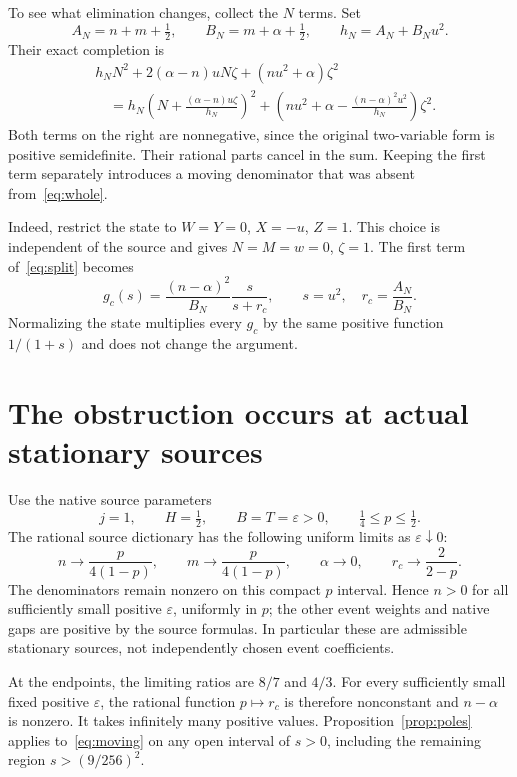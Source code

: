\documentclass[11pt]{article}
\begin{document}
To see what elimination changes, collect the $N$ terms. Set
\[
 A_N=n+m+\tfrac12,\qquad B_N=m+\alpha+\tfrac12,
 \qquad h_N=A_N+B_Nu^2.
\]
Their exact completion is
\begin{align}
 &h_NN^2+2(\alpha-n)uN\zeta+(nu^2+\alpha)\zeta^2 \nonumber\\
 &\quad=h_N\left(N+\frac{(\alpha-n)u\zeta}{h_N}\right)^2
 +\left(nu^2+\alpha-
       \frac{(n-\alpha)^2u^2}{h_N}\right)\zeta^2.       \label{eq:split}
\end{align}
Both terms on the right are nonnegative, since the original
two-variable form is positive semidefinite. Their rational parts cancel
in the sum. Keeping the first term separately introduces a moving
denominator that was absent from~\eqref{eq:whole}.

Indeed, restrict the state to $W=Y=0$, $X=-u$, $Z=1$. This choice is
independent of the source and gives $N=M=w=0$, $\zeta=1$. The first
term of~\eqref{eq:split} becomes
\begin{equation}
 g_c(s)=\frac{(n-\alpha)^2}{B_N}\frac{s}{s+r_c},
 \qquad s=u^2,\quad r_c=\frac{A_N}{B_N}.             \label{eq:moving}
\end{equation}
Normalizing the state multiplies every $g_c$ by the same positive
function $1/(1+s)$ and does not change the argument.

\section{The obstruction occurs at actual stationary sources}

Use the native source parameters
\begin{equation}
 j=1,\qquad H=\tfrac12,\qquad B=T=\varepsilon>0,
 \qquad \tfrac14\leq p\leq\tfrac12 .              \label{eq:path}
\end{equation}
The rational source dictionary has the following uniform limits as
$\varepsilon\downarrow0$:
\[
 n\longrightarrow\frac{p}{4(1-p)},\qquad
 m\longrightarrow\frac{p}{4(1-p)},\qquad
 \alpha\longrightarrow0,
 \qquad r_c\longrightarrow\frac{2}{2-p}.
\]
The denominators remain nonzero on this compact $p$ interval. Hence
$n>0$ for all sufficiently small positive $\varepsilon$, uniformly in
$p$; the other event weights and native gaps are positive by the
source formulas. In particular these are admissible stationary
sources, not independently chosen event coefficients.

At the endpoints, the limiting ratios are $8/7$ and $4/3$. For every
sufficiently small fixed positive $\varepsilon$, the rational function
$p\mapsto r_c$ is therefore nonconstant and $n-\alpha$ is nonzero.
It takes infinitely many positive values. Proposition~\ref{prop:poles}
applies to~\eqref{eq:moving} on any open interval of $s>0$, including
the remaining region $s>(9/256)^2$.
\end{document}
